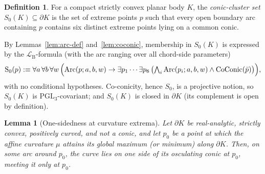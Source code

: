 \documentclass[11pt]{amsart}
\newtheorem{lemma}[theorem]{Lemma}
\theoremstyle{definition}
\newtheorem{definition}[theorem]{Definition}
\newcommand{\LB}{\mathcal{L}_{\mathrm{B}}}
\newcommand{\PGL}{\mathrm{PGL}}
\begin{document}
\begin{definition}\label{def:conic-cluster}
For a compact strictly convex planar body $K$, the \emph{conic-cluster set}
$S_0(K)\subseteq\partial K$ is the set of extreme points $p$ such that every
open boundary arc containing $p$ contains six distinct extreme points lying on
a common conic.
\end{definition}

By Lemmas~\ref{lem:arc-def} and~\ref{lem:coconic}, membership in $S_0(K)$ is
expressed by the $\LB$-formula (with the arc ranging over all chord-side
parameters)
\[
\mathrm{S}_0(p):\equiv\forall a\,\forall b\,\forall w\,
\Bigl(\mathrm{Arc}(p;a,b,w)\to
\exists p_1\cdots\exists p_6\,\bigl(\textstyle\bigwedge_i
\mathrm{Arc}(p_i;a,b,w)\wedge\mathrm{CoConic}(\bar p)\bigr)\Bigr),
\]
with no conditional hypotheses. Co-conicity, hence $S_0$, is a
projective notion, so $S_0(K)$ is $\PGL_3$-covariant; and $S_0(K)$ is closed
in $\partial K$ (its complement is open by definition).

\begin{lemma}[One-sidedness at curvature extrema]\label{lem:onesided}
Let $\partial K$ be real-analytic, strictly convex, positively curved, and not
a conic, and let $p_0$ be a point at which the affine curvature $\mu$ attains
its global maximum (or minimum) along $\partial K$. Then, on some arc around
$p_0$, the curve lies on one side of its osculating conic at $p_0$, meeting it
only at $p_0$.
\end{lemma}
\end{document}
